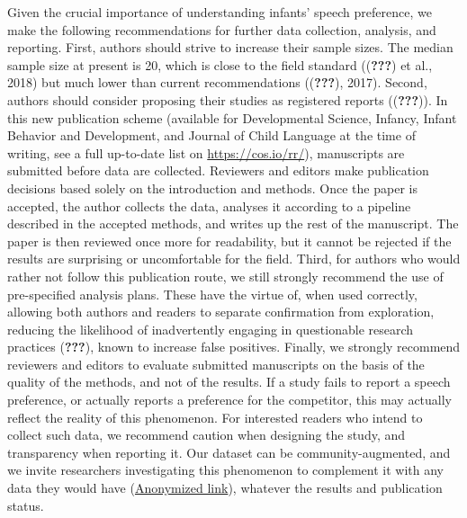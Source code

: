 \documentclass[man]{apa6}
\begin{document}
Given the crucial importance of understanding infants' speech
preference, we make the following recommendations for further data
collection, analysis, and reporting. First, authors should strive to
increase their sample sizes. The median sample size at present is 20,
which is close to the field standard (({\textbf{???}}) et al., 2018) but
much lower than current recommendations (({\textbf{???}}), 2017).
Second, authors should consider proposing their studies as registered
reports (({\textbf{???}})). In this new publication scheme (available
for Developmental Science, Infancy, Infant Behavior and Development, and
Journal of Child Language at the time of writing, see a full up-to-date
list on \url{https://cos.io/rr/}), manuscripts are submitted before data
are collected. Reviewers and editors make publication decisions based
solely on the introduction and methods. Once the paper is accepted, the
author collects the data, analyses it according to a pipeline described
in the accepted methods, and writes up the rest of the manuscript. The
paper is then reviewed once more for readability, but it cannot be
rejected if the results are surprising or uncomfortable for the field.
Third, for authors who would rather not follow this publication route,
we still strongly recommend the use of pre-specified analysis plans.
These have the virtue of, when used correctly, allowing both authors and
readers to separate confirmation from exploration, reducing the
likelihood of inadvertently engaging in questionable research practices
({\textbf{???}}), known to increase false positives. Finally, we
strongly recommend reviewers and editors to evaluate submitted
manuscripts on the basis of the quality of the methods, and not of the
results. If a study fails to report a speech preference, or actually
reports a preference for the competitor, this may actually reflect the
reality of this phenomenon. For interested readers who intend to collect
such data, we recommend caution when designing the study, and
transparency when reporting it. Our dataset can be community-augmented,
and we invite researchers investigating this phenomenon to complement it
with any data they would have
(\href{https://osf.io/4stz9/?view_only=d0696591ebf34bfc8430f848cd945ca8}{Anonymized
link}), whatever the results and publication status.

\newpage

\begingroup
\setlength{\parindent}{-0.5in} \setlength{\leftskip}{0.5in}

\hypertarget{refs}{}

\endgroup
\end{document}
